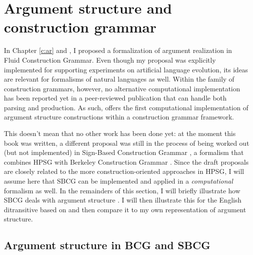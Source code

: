 \section{Argument structure and construction grammar}
\label{s:comp-formalism}

In Chapter \ref{c:ar} and \citet{vantrijp08argumentsstruktur}, I proposed a formalization of argument realization in Fluid Construction Grammar. Even though my proposal was explicitly implemented for supporting experiments on artificial language evolution, its ideas are relevant for formalisms of natural languages as well. Within the family of construction grammars, however, no alternative computational implementation has been reported yet in a peer-reviewed publication that can handle both parsing and production. As such, \citet{vantrijp08argumentsstruktur} offers the first computational implementation of argument structure constructions within a construction grammar framework.

This doesn't mean that no other work has been done yet: at the moment this book was written, a different proposal was still in the process of being worked out (but not implemented) in Sign-Based Construction Grammar \citep[SBCG,][]{fillmore08construction}, a formalism that combines HPSG \citep{sag94hpsg} with Berkeley Construction Grammar \citep[BCG,][]{kay99grammatical}. Since the draft proposals are closely related to the more construction-oriented approaches in HPSG, I will assume here that SBCG can be implemented and applied in a {\em computational} formalism as well. In the remainders of this section, I will briefly illustrate how SBCG deals with argument structure \citep[based on][]{fillmore08construction, kay05argument, michaelis06complementation,sag07sbcg}. I will then illustrate this for the English ditransitive based on \citet{kay05argument} and then compare it to my own representation of argument structure.

\subsection{Argument structure in BCG and SBCG}
\label{s:comp-bcg}

